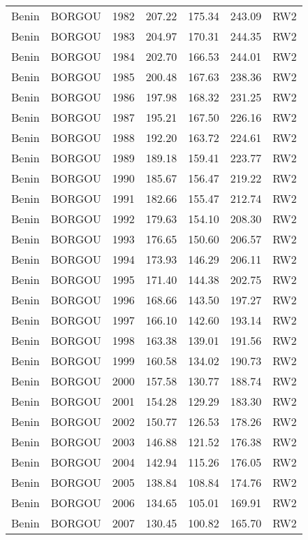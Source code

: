 \begin{longtable}{lllrrrl}
  Benin & BORGOU & 1982 & 207.22 & 175.34 & 243.09 & RW2 \\ 
  Benin & BORGOU & 1983 & 204.97 & 170.31 & 244.35 & RW2 \\ 
  Benin & BORGOU & 1984 & 202.70 & 166.53 & 244.01 & RW2 \\ 
  Benin & BORGOU & 1985 & 200.48 & 167.63 & 238.36 & RW2 \\ 
  Benin & BORGOU & 1986 & 197.98 & 168.32 & 231.25 & RW2 \\ 
  Benin & BORGOU & 1987 & 195.21 & 167.50 & 226.16 & RW2 \\ 
  Benin & BORGOU & 1988 & 192.20 & 163.72 & 224.61 & RW2 \\ 
  Benin & BORGOU & 1989 & 189.18 & 159.41 & 223.77 & RW2 \\ 
  Benin & BORGOU & 1990 & 185.67 & 156.47 & 219.22 & RW2 \\ 
  Benin & BORGOU & 1991 & 182.66 & 155.47 & 212.74 & RW2 \\ 
  Benin & BORGOU & 1992 & 179.63 & 154.10 & 208.30 & RW2 \\ 
  Benin & BORGOU & 1993 & 176.65 & 150.60 & 206.57 & RW2 \\ 
  Benin & BORGOU & 1994 & 173.93 & 146.29 & 206.11 & RW2 \\ 
  Benin & BORGOU & 1995 & 171.40 & 144.38 & 202.75 & RW2 \\ 
  Benin & BORGOU & 1996 & 168.66 & 143.50 & 197.27 & RW2 \\ 
  Benin & BORGOU & 1997 & 166.10 & 142.60 & 193.14 & RW2 \\ 
  Benin & BORGOU & 1998 & 163.38 & 139.01 & 191.56 & RW2 \\ 
  Benin & BORGOU & 1999 & 160.58 & 134.02 & 190.73 & RW2 \\ 
  Benin & BORGOU & 2000 & 157.58 & 130.77 & 188.74 & RW2 \\ 
  Benin & BORGOU & 2001 & 154.28 & 129.29 & 183.30 & RW2 \\ 
  Benin & BORGOU & 2002 & 150.77 & 126.53 & 178.26 & RW2 \\ 
  Benin & BORGOU & 2003 & 146.88 & 121.52 & 176.38 & RW2 \\ 
  Benin & BORGOU & 2004 & 142.94 & 115.26 & 176.05 & RW2 \\ 
  Benin & BORGOU & 2005 & 138.84 & 108.84 & 174.76 & RW2 \\ 
  Benin & BORGOU & 2006 & 134.65 & 105.01 & 169.91 & RW2 \\ 
  Benin & BORGOU & 2007 & 130.45 & 100.82 & 165.70 & RW2 \\ 

\end{longtable}

